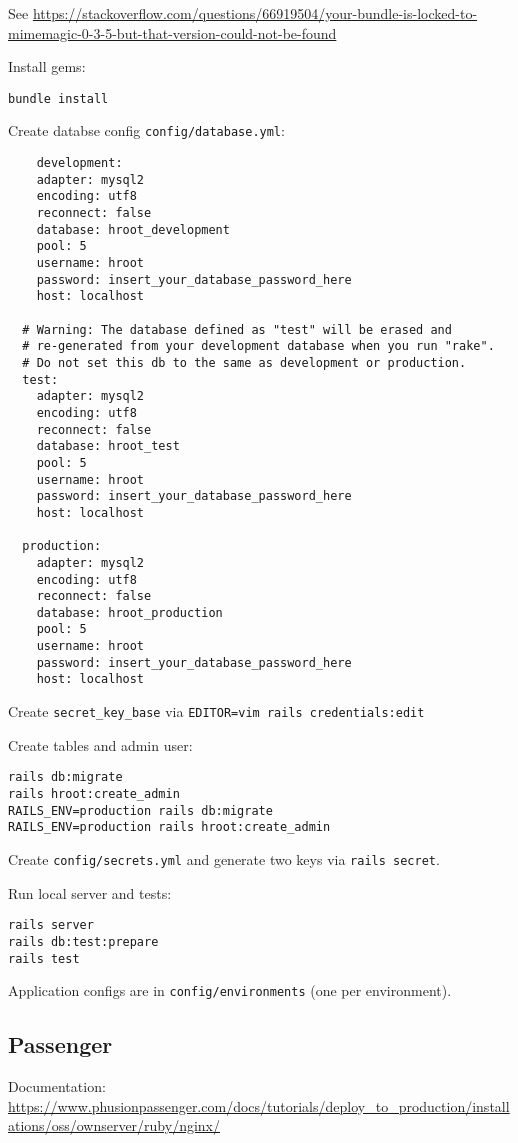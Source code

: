 \documentclass{article}
\begin{document}
See \url{https://stackoverflow.com/questions/66919504/your-bundle-is-locked-to-mimemagic-0-3-5-but-that-version-could-not-be-found}

Install gems:
\begin{lstlisting}
bundle install
\end{lstlisting}

Create databse config \verb|config/database.yml|:
\begin{lstlisting}
    development:
    adapter: mysql2
    encoding: utf8
    reconnect: false
    database: hroot_development
    pool: 5
    username: hroot
    password: insert_your_database_password_here
    host: localhost
  
  # Warning: The database defined as "test" will be erased and
  # re-generated from your development database when you run "rake".
  # Do not set this db to the same as development or production.
  test:
    adapter: mysql2
    encoding: utf8
    reconnect: false
    database: hroot_test
    pool: 5
    username: hroot
    password: insert_your_database_password_here
    host: localhost
  
  production:
    adapter: mysql2
    encoding: utf8
    reconnect: false
    database: hroot_production
    pool: 5
    username: hroot
    password: insert_your_database_password_here
    host: localhost
\end{lstlisting}

Create \verb|secret_key_base| via \verb|EDITOR=vim rails credentials:edit|

Create tables and admin user:
\begin{lstlisting}
rails db:migrate
rails hroot:create_admin
RAILS_ENV=production rails db:migrate
RAILS_ENV=production rails hroot:create_admin
\end{lstlisting}

Create \verb|config/secrets.yml| and generate two keys via \verb|rails secret|.

Run local server and tests:
\begin{lstlisting}
rails server
rails db:test:prepare
rails test
\end{lstlisting}

Application configs are in \verb|config/environments| (one per environment).

\subsection{Passenger}
Documentation: \url{https://www.phusionpassenger.com/docs/tutorials/deploy_to_production/installations/oss/ownserver/ruby/nginx/}
\end{document}
